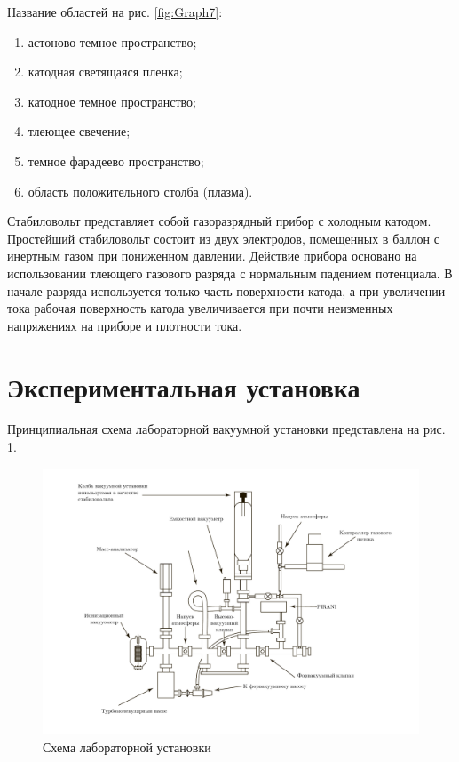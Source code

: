 \documentclass[a4paper, 12pt]{article}
\begin{document}
\par
Название областей на рис. \ref{fig:Graph7}:
\begin{enumerate}
		\item астоново темное пространство;
		\item катодная светящаяся пленка;
		\item катодное темное пространство;
		\item тлеющее свечение;
		\item темное фарадеево пространство;
		\item область положительного столба (плазма).
\end{enumerate}
\par
Стабиловольт представляет собой газоразрядный прибор с холодным катодом. Простейший стабиловольт состоит из двух электродов, помещенных в баллон с инертным газом при пониженном давлении. Действие прибора основано на использовании тлеющего газового разряда с нормальным падением потенциала. В начале разряда используется только часть поверхности катода, а при увеличении тока рабочая поверхность катода увеличивается при почти неизменных напряжениях на приборе и плотности тока.\par
\newpage
\section{Экспериментальная установка}
Принципиальная схема лабораторной вакуумной установки представлена на рис. \ref{fig:MyGraph6}.
\begin{figure}[h!]
	\centering
	\includegraphics[scale=0.4]{MyGraph6.pdf}
	\caption{Схема лабораторной установки}
	\label{fig:MyGraph6}
\end{figure}
\end{document}
